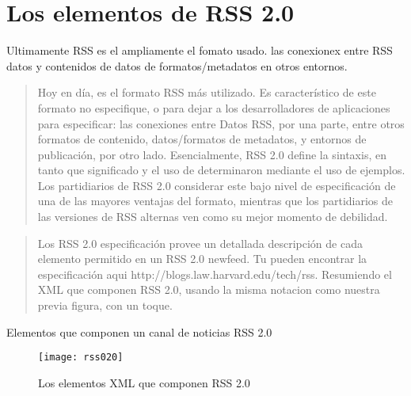 \normalsize

\section{Los elementos de RSS 2.0}

Ultimamente RSS es el ampliamente el fomato usado. las conexionex entre RSS datos y contenidos de datos
de formatos/metadatos en otros entornos.

\scriptsize

\blockquote{
Hoy en d\'{i}a, es el formato RSS m\'{a}s utilizado. Es caracter\'{i}stico de este formato no especifique,
o para dejar a los desarrolladores de aplicaciones para especificar: las conexiones entre Datos RSS, por una
parte, entre otros formatos de contenido, datos/formatos de metadatos, y entornos de publicaci\'{o}n, por otro
lado. Esencialmente, RSS 2.0 define la sintaxis, en tanto que significado y el uso de determinaron mediante el
uso de ejemplos. Los partidiarios de RSS 2.0 considerar este bajo nivel de especificaci\'{o}n de una de las
mayores ventajas del formato, mientras que los partidiarios de las versiones de RSS alternas ven como su mejor
momento de debilidad.\cite{wittenbrink2005rss}
}

\blockquote{
Los RSS 2.0 especificación provee un detallada descripci\'{o}n de cada elemento permitido en un RSS 2.0
newfeed. Tu pueden encontrar la especificación aqui  http://blogs.law.harvard.edu/tech/rss. Resumiendo
el XML que componen RSS 2.0, usando la misma notacion como nuestra previa figura, con un toque.
}

\normalsize

Elementos que componen un canal de noticias RSS 2.0


\begin{figure}[!ht]
\centering
\texttt{[image: rss020]}
\caption{Los elementos XML que componen RSS 2.0}
\end{figure}

\scriptsize

